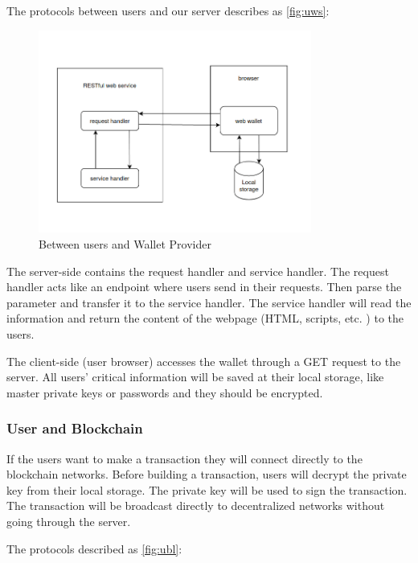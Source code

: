 The protocols between users and our server describes as \autoref{fig:uws}:

\begin{figure}[ht!]
    \centering
    \includegraphics[width=0.8\textwidth]{images/design_uws.png}
    \caption[Between users and Wallet Provider]{Between users and Wallet Provider}
    \label{fig:uws}
\end{figure}

The server-side contains the request handler and service handler. The request handler acts like an endpoint where users send in their requests. Then parse the parameter and transfer it to the service handler. The service handler will read the information and return the content of the webpage (HTML, scripts, etc. ) to the users.

The client-side (user browser) accesses the wallet through a GET request to the server. All users' critical information will be saved at their local storage, like master private keys or passwords and they should be encrypted.

\subsubsection{User and Blockchain}

If the users want to make a transaction they will connect directly to the blockchain networks. Before building a transaction, users will decrypt the private key from their local storage. The private key will be used to sign the transaction. The transaction will be broadcast directly to decentralized networks without going through the server.

The protocols described as \autoref{fig:ubl}:

